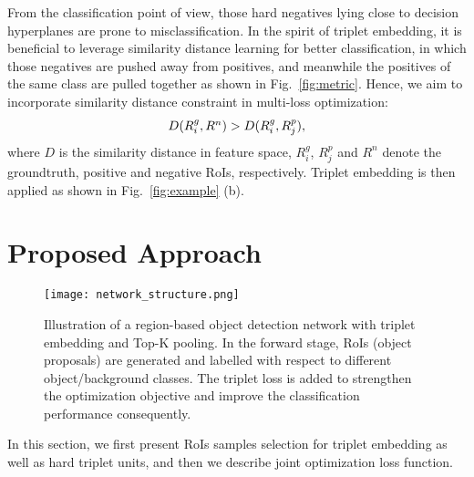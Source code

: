 \documentclass{article}
\begin{document}
{From the classification point of view, those hard negatives lying close to decision hyperplanes are prone to misclassification. In the spirit of triplet embedding, it is beneficial to leverage similarity distance learning for better classification, in which those negatives are pushed away from positives, and meanwhile the positives of the same class are pulled together as shown in Fig.~\ref{fig:metric}. Hence, we aim to incorporate similarity distance constraint in multi-loss optimization:
\vspace{-2pt}
\begin{equation}
\begin{array}{cl}
D(R^g_i, R^n) >  D(R^g_i, R^p_j),
\end{array}
\vspace{-5pt}
\label{eq2}
\end{equation}
where $D$ is the similarity distance in feature space, $R^g_i$, $R^p_j$ and $R^n$ denote the groundtruth, positive and negative RoIs, respectively. Triplet embedding is then applied as shown in Fig.~\ref{fig:example} (b).

\section{Proposed Approach}

\begin{figure*}[!ht]
  \centering
  \vspace{-5pt}
  \texttt{[image: network\_structure.png]}
  \caption{Illustration of a region-based object detection network with triplet embedding and Top-K pooling. In the forward stage, RoIs (object proposals) are generated and labelled with respect to different object/background classes. The triplet loss is added to strengthen the optimization objective and improve the classification performance consequently. }
 \label{fig:network}
  \vspace*{-10pt}
\end{figure*}
In this section, we first present RoIs samples selection for triplet embedding as well as hard triplet units, and then we describe joint optimization loss function.


}
\end{document}
